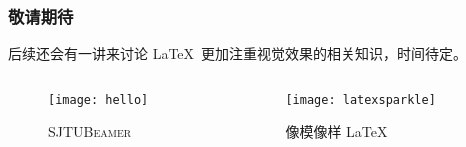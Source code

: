 \begin{frame}
  \frametitle{敬请期待}
  
  后续还会有一讲来讨论 \LaTeX\ 更加注重视觉效果的相关知识，时间待定。

  \begin{columns}
    \begin{column}{0.5\textwidth}
      \begin{figure}[H]
        \begin{stampbox}[sjtuRedPrimary]
          \texttt{[image: hello]}
        \end{stampbox}
        \caption{\textsc{SJTUBeamer} }
      \end{figure}
    \end{column}
    \begin{column}{0.5\textwidth}
      \begin{figure}[H]
        \begin{stampbox}[sjtuRedPrimary]
          \texttt{[image: latexsparkle]}
        \end{stampbox}
        \caption{像模像样 \LaTeX\ }
      \end{figure}
    \end{column}
  \end{columns}
\end{frame}